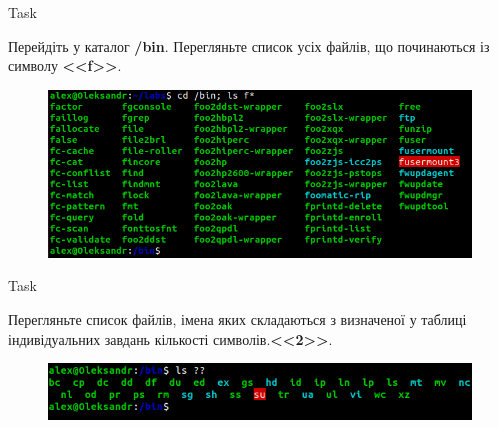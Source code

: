 \documentclass[a4paper,12pt]{article}
\newcommand{\RomanNumeralCaps}[1]{\MakeUppercase{\romannumeral #1}}
\begin{document}
\newpage
    \begin{center}
        \Large{Task \RomanNumeralCaps{1}}
    \end{center}
    Перейдіть у каталог \textbf{/bin}. Перегляньте список усіх файлів, що починаються із символу \textbf{<<f>>}.
    \begin{figure}[h!]
        \begin{minipage}[h]{1\linewidth}
            \centering
            \includegraphics[width=0.6\linewidth]{Prt sc/Figure_1.png}  
        \end{minipage}
    \end{figure}

    \begin{center}
        \Large{Task \RomanNumeralCaps{2}}
    \end{center}
    Перегляньте список файлів, імена яких складаються з визначеної у таблиці індивідуальних завдань кількості символів.\textbf{<<2>>}.
    \begin{figure}[h!]
        \begin{minipage}[h]{1\linewidth}
            \centering
            \includegraphics[width=0.5\linewidth]{Prt sc/Figure_2.png}  
        \end{minipage}
    \end{figure}
\end{document}
